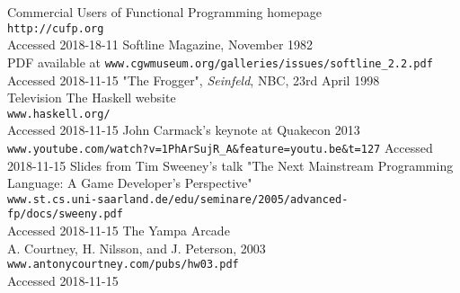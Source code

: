 \documentclass[12pt, a4paper]{report}
\begin{document}
\begin{thebibliography}{0}
    Commercial Users of Functional Programming homepage\\
    \verb|http://cufp.org|\\
    Accessed 2018-18-11
    Softline Magazine, November 1982\\
    PDF available at \verb|www.cgwmuseum.org/galleries/issues/softline_2.2.pdf|\\
    Accessed 2018-11-15
    "The Frogger", \textit{Seinfeld}, NBC, 23rd April 1998\\
    Television
    The Haskell website\\
    \verb|www.haskell.org/|\\
    Accessed 2018-11-15
    John Carmack's keynote at Quakecon 2013\\
    \verb|www.youtube.com/watch?v=1PhArSujR_A&feature=youtu.be&t=127|
    Accessed 2018-11-15
    Slides from Tim Sweeney's talk "The Next Mainstream Programming Language: A Game Developer’s Perspective"\\
    \verb|www.st.cs.uni-saarland.de/edu/seminare/2005/advanced-fp/docs/sweeny.pdf|\\
    Accessed 2018-11-15
    The Yampa Arcade\\
    A. Courtney, H. Nilsson, and J. Peterson, 2003\\
    \verb|www.antonycourtney.com/pubs/hw03.pdf|\\
    Accessed 2018-11-15
\end{thebibliography}
\end{document}
